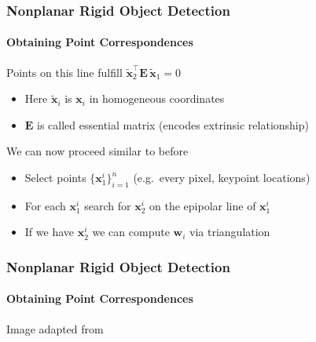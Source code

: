 \documentclass[xetex,professionalfont]{beamer}
\renewcommand{\vec}[1]{\ensuremath{\mathbf{#1}}}
\newcommand{\vw}{\vec{w}}
\newcommand{\vx}{\vec{x}}
\newcommand{\vE}{\vec{E}}
\renewcommand\emph[1]{\textcolor{tuwcvl_inf_red}{#1}}
\begin{document}

\begin{frame}
\frametitle{Nonplanar Rigid Object Detection}
\framesubtitle{Obtaining Point Correspondences}

Points on this line fulfill $\tilde{\vx}_2^\top\vE\,\tilde{\vx}_1=0$
\begin{itemize}
    \item Here $\tilde{\vx}_i$ is $\vx_i$ in homogeneous coordinates
    \item $\vE$ is called \emph{essential matrix} (encodes extrinsic relationship)
\end{itemize}

\bigskip
We can now proceed similar to before
\begin{itemize}
    \item Select points $\{\vx^i_1\}_{i=1}^n$ (e.g.\ every pixel, keypoint locations)
    \item For each $\vx^i_1$ search for $\vx^i_2$ on the epipolar line of $\vx^i_1$ %
    \item If we have $\vx^i_2$ we can compute $\vw_i$ via \emph{triangulation}
\end{itemize}

\end{frame}


\begin{frame}
\frametitle{Nonplanar Rigid Object Detection}
\framesubtitle{Obtaining Point Correspondences}

\begin{center}
    {\centering Image adapted from \cite{prince12}}
\end{center}

\end{frame}
\end{document}
